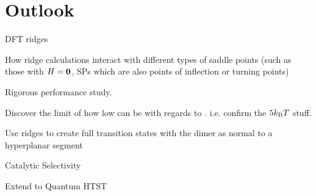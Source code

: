 \section{Outlook}
\label{sec:summary-outlook}

\bit
\item DFT ridges
\item How ridge calculations interact with different types of saddle points (such as those with $H = {\mathrm{\mathbf{\bm{0}}}}$, SPs which are also points of inflection or turning points)
\item Rigorous performance study.
\item Discover the limit of how low  can be with regards to . i.e. confirm the $5k_\text{B} T$ stuff.
\item Use ridges to create full transition states with the dimer as normal to a hyperplanar segment
\item Catalytic Selectivity
\item Extend to Quantum HTST
\eit

\placeholder
